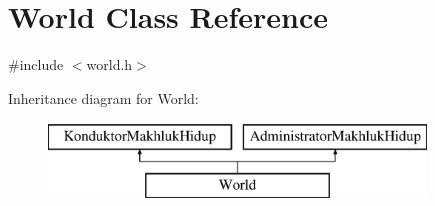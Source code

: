 \hypertarget{class_world}{}\section{World Class Reference}
\label{class_world}


{\ttfamily \#include $<$world.\+h$>$}

Inheritance diagram for World\+:\begin{figure}[H]
\begin{center}
\leavevmode
\includegraphics[height=2.000000cm]{class_world}
\end{center}
\end{figure}
